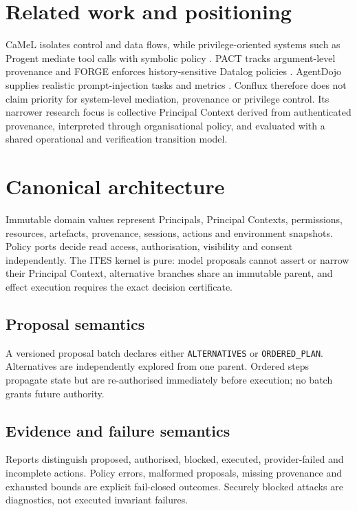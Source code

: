 \documentclass[11pt]{article}
\begin{document}
\section{Related work and positioning}
CaMeL isolates control and data flows, while privilege-oriented systems such as
Progent mediate tool calls with symbolic policy \citep{camel,progent}. PACT
tracks argument-level provenance and FORGE enforces history-sensitive Datalog
policies \citep{pact,forge}. AgentDojo supplies realistic prompt-injection tasks
and metrics \citep{agentdojo}. Conflux therefore does not claim priority for
system-level mediation, provenance or privilege control. Its narrower research
focus is collective Principal Context derived from authenticated provenance,
interpreted through organisational policy, and evaluated with a shared
operational and verification transition model.

\section{Canonical architecture}
Immutable domain values represent Principals, Principal Contexts, permissions,
resources, artefacts, provenance, sessions, actions and environment snapshots.
Policy ports decide read access, authorisation, visibility and consent
independently. The ITES kernel is pure: model proposals cannot assert or narrow
their Principal Context, alternative branches share an immutable parent, and
effect execution requires the exact decision certificate.

\subsection{Proposal semantics}
A versioned proposal batch declares either \texttt{ALTERNATIVES} or
\texttt{ORDERED\_PLAN}. Alternatives are independently explored from one
parent. Ordered steps propagate state but are re-authorised immediately before
execution; no batch grants future authority.

\subsection{Evidence and failure semantics}
Reports distinguish proposed, authorised, blocked, executed, provider-failed
and incomplete actions. Policy errors, malformed proposals, missing provenance
and exhausted bounds are explicit fail-closed outcomes. Securely blocked
attacks are diagnostics, not executed invariant failures.
\end{document}
